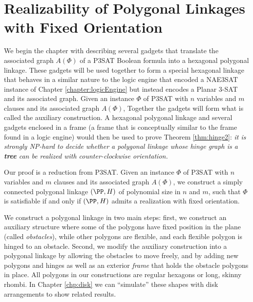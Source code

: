 \documentclass[10pt]{CSUNthesis}
\theoremstyle{plain}%
\theoremstyle{definition}
\theoremstyle{remark}
\begin{document}
\chapter{Realizability of Polygonal Linkages with Fixed Orientation\label{chapter:polygonalLinkage}} 

We begin the chapter with describing several gadgets that translate the associated graph $A(\Phi)$ of a P3SAT Boolean formula into a hexagonal polygonal linkage.  
These gadgets will be used together to form a special hexagonal linkage that behaves in a similar nature to the logic engine that encoded a NAE3SAT instance of Chapter \ref{chapter:logicEngine} but instead encodes a Planar 3-SAT and its associated graph.  
Given an instance $\Phi$ of P3SAT with $n$ variables and $m$ clauses and its associated graph $A(\Phi)$, 
Together the gadgets will form what is called the auxiliary construction.
A hexagonal polygonal linkage and several gadgets enclosed in a frame (a frame that is conceptually similar to the frame found in a logic engine) would then be used to prove Theorem \ref{thm:hinge2}: \textit{it is strongly NP-hard to decide whether a polygonal linkage whose hinge graph is a \textbf{tree} can be realized with counter-clockwise orientation.}

Our proof is a reduction from P3SAT.
Given an instance $\Phi$ of P3SAT with $n$ variables and $m$ clauses and its associated graph $A(\Phi)$, we construct a simply connected polygonal linkage $(\PP,H)$ of polynomial size in $n$ and $m$, such that $\Phi$ is satisfiable if and only if $(\PP,H)$ admits a realization with fixed orientation. 


We construct a polygonal linkage in two main steps: first, we construct an auxiliary structure where some of the polygons have fixed position in the plane (called \emph{obstacles}), while other polygons are flexible, and each flexible polygon is hinged to an obstacle. 
Second, we modify the auxiliary construction into a polygonal linkage by allowing the obstacles to move freely, and by adding new polygons and hinges as well as an exterior \emph{frame} that holds the obstacle polygons in place.
All polygons in our constructions are regular hexagons or long, skinny rhombi.
In Chapter \ref{chp:disk} we can ``simulate'' these shapes with disk arrangements to show related results.
\end{document}
